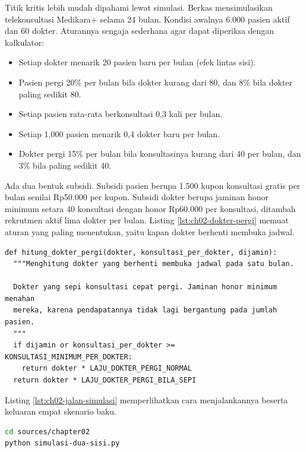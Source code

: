 \begin{pendalaman}[title={Pendalaman Teknis (opsional): Simulasi Pertumbuhan Dua Sisi}]
Titik kritis lebih mudah dipahami lewat simulasi. Berkas
 mensimulasikan telekonsultasi
Medikara+ selama 24 bulan. Kondisi awalnya 6.000 pasien aktif dan 60 dokter.
Aturannya sengaja sederhana agar dapat diperiksa dengan kalkulator:
\begin{itemize}
  \item Setiap dokter menarik 20 pasien baru per bulan (efek lintas sisi).
  \item Pasien pergi 20\% per bulan bila dokter kurang dari 80, dan 8\% bila
        dokter paling sedikit 80.
  \item Setiap pasien rata-rata berkonsultasi 0,3 kali per bulan.
  \item Setiap 1.000 pasien menarik 0,4 dokter baru per bulan.
  \item Dokter pergi 15\% per bulan bila konsultasinya kurang dari 40 per
        bulan, dan 3\% bila paling sedikit 40.
\end{itemize}

Ada dua bentuk subsidi. Subsidi pasien berupa 1.500 kupon konsultasi gratis per
bulan senilai Rp50.000 per kupon. Subsidi dokter berupa jaminan honor minimum
setara 40 konsultasi dengan honor Rp60.000 per konsultasi, ditambah rekrutmen
aktif lima dokter per bulan. Listing \ref{lst:ch02-dokter-pergi} memuat aturan
yang paling menentukan, yaitu kapan dokter berhenti membuka jadwal.

\begin{lstlisting}[style=ch02python, caption={Aturan kepergian dokter, tersedia di \berkas{sources/chapter02/simulasi-dua-sisi.py}}, label={lst:ch02-dokter-pergi}]
def hitung_dokter_pergi(dokter, konsultasi_per_dokter, dijamin):
  """Menghitung dokter yang berhenti membuka jadwal pada satu bulan.

  Dokter yang sepi konsultasi cepat pergi. Jaminan honor minimum menahan
  mereka, karena pendapatannya tidak lagi bergantung pada jumlah pasien.
  """
  if dijamin or konsultasi_per_dokter >= KONSULTASI_MINIMUM_PER_DOKTER:
    return dokter * LAJU_DOKTER_PERGI_NORMAL
  return dokter * LAJU_DOKTER_PERGI_BILA_SEPI
\end{lstlisting}

Listing \ref{lst:ch02-jalan-simulasi} memperlihatkan cara menjalankannya beserta
keluaran empat skenario baku.

\begin{lstlisting}[language=bash, caption={Menjalankan empat skenario baku, memakai \berkas{sources/chapter02/simulasi-dua-sisi.py}}, label={lst:ch02-jalan-simulasi}]
cd sources/chapter02
python simulasi-dua-sisi.py


\end{lstlisting}
\end{pendalaman}
